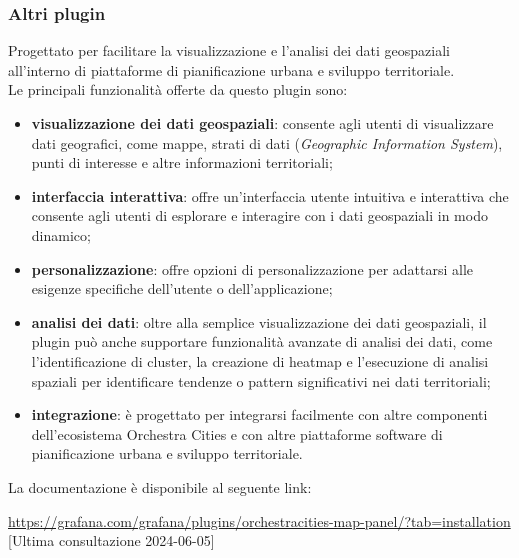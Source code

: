 \subsubsection{Altri plugin}
Progettato per facilitare la visualizzazione e l'analisi dei dati geospaziali all'interno di piattaforme di pianificazione urbana e sviluppo territoriale.\\
Le principali funzionalità offerte da questo plugin sono:
\begin{itemize}
	\item \textbf{visualizzazione dei dati geospaziali}: consente agli utenti di visualizzare dati geografici, come mappe, strati di dati  (\textit{Geographic Information System}), punti di interesse e altre informazioni territoriali;
	\item \textbf{interfaccia interattiva}: offre un'interfaccia utente intuitiva e interattiva che consente agli utenti di esplorare e interagire con i dati geospaziali in modo dinamico;
	\item \textbf{personalizzazione}: offre opzioni di personalizzazione per adattarsi alle esigenze specifiche dell'utente o dell'applicazione;
	\item \textbf{analisi dei dati}: oltre alla semplice visualizzazione dei dati geospaziali, il plugin può anche supportare funzionalità avanzate di analisi dei dati, come l'identificazione di cluster, la creazione di heatmap e l'esecuzione di analisi spaziali per identificare tendenze o pattern significativi nei dati territoriali;
	\item \textbf{integrazione}: è progettato per integrarsi facilmente con altre componenti dell'ecosistema Orchestra Cities e con altre piattaforme software di pianificazione urbana e sviluppo territoriale.
\end{itemize}

La documentazione è disponibile al seguente link:
\begin{center}
	\url{https://grafana.com/grafana/plugins/orchestracities-map-panel/?tab=installation} [Ultima consultazione 2024-06-05]
\end{center}

